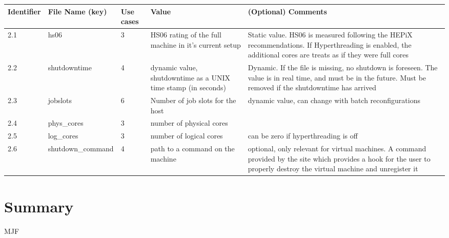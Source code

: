 \documentclass[12pt,a4paper]{article}
\begin{document}
\begin{tabular}{l l l p{2.5cm} p{5cm}}
Identifier & File Name (key) & Use cases & Value & (Optional) Comments \\
\hline
2.1	& hs06			& 3	& HS06 rating of the full machine in it's current setup & Static value. HS06 is measured following the HEPiX recommendations. If Hyperthreading is enabled, the additional cores are treats as if they were full cores \\
2.2	& shutdowntime		& 4	& dynamic value, shutdowntime as a UNIX time stamp (in seconds) & Dynamic. If the file is missing, no shutdown is foreseen. The value is in real time, and must be in the future. Must be removed if the shutdowntime has arrived \\
2.3	& jobslots		& 6	& Number of job slots for the host & dynamic value, can change with batch reconfigurations \\
2.4	& phys\_cores		& 3	& number of physical cores &  \\
2.5	& log\_cores		& 3	& number of logical cores & can be zero if hyperthreading is off \\
2.6	& shutdown\_command	& 4	& path to a command on the machine & optional, only relevant for virtual machines. A command provided by the site which provides a hook for the user to properly destroy the virtual machine and unregister it \\
\end{tabular}

\clearpage



\section{Summary}
\label{sec:Summary}

MJF



%
%
%


\end{document}
